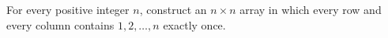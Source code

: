 For every positive integer $n$, construct an $n\times n$ array in which every row and every column contains $1,2,\ldots,n$ exactly once.
